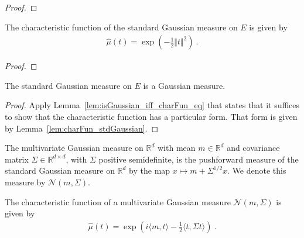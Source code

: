 \begin{proof}

\end{proof}


\begin{lemma}\label{lem:charFun_stdGaussian}
The characteristic function of the standard Gaussian measure on $E$ is given by
\begin{align*}
  \hat{\mu}(t) = \exp\left(-\frac{1}{2} \Vert t \Vert^2 \right) \: .
\end{align*}
\end{lemma}

\begin{proof}

\end{proof}


\begin{lemma}\label{lem:isGaussian_stdGaussian}
The standard Gaussian measure on $E$ is a Gaussian measure.
\end{lemma}

\begin{proof}
Apply Lemma~\ref{lem:isGaussian_iff_charFun_eq} that states that it suffices to show that the characteristic function has a particular form.
That form is given by Lemma~\ref{lem:charFun_stdGaussian}.
\end{proof}


\begin{definition}\label{def:multivariateGaussian}
The multivariate Gaussian measure on $\mathbb{R}^d$ with mean $m \in \mathbb{R}^d$ and covariance matrix $\Sigma \in \mathbb{R}^{d \times d}$, with $\Sigma$ positive semidefinite, is the pushforward measure of the standard Gaussian measure on $\mathbb{R}^d$ by the map $x \mapsto m + \Sigma^{1/2} x$.
We denote this measure by $\mathcal{N}(m, \Sigma)$.
\end{definition}


\begin{theorem}\label{thm:charFun_multivariateGaussian}
The characteristic function of a multivariate Gaussian measure $\mathcal{N}(m, \Sigma)$ is given by
\begin{align*}
  \hat{\mu}(t) = \exp\left(i \langle m, t \rangle - \frac{1}{2} \langle t, \Sigma t \rangle\right)
  \: .
\end{align*}
\end{theorem}

